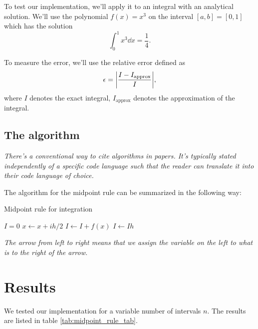 \documentclass[english,notitlepage, reprint]{revtex4-1}  %
\begin{document}
To test our implementation, we'll apply it to an integral with an analytical solution. We'll use the  polynomial $f(x) = x^3$ on the interval $[a,b] = [0,1]$ which has the solution 
\begin{equation}
	\int_0^1 x^3 \dd x = \frac{1}{4}.
\end{equation}

To measure the error, we'll use the relative error defined as 
\begin{equation}
 	\epsilon = \abs{ \frac{I - I_{\text{approx}}}{I} },
\end{equation}
where $I$ denotes the exact integral, $I_\text{approx}$ denotes the approximation of the integral.

\subsection*{The algorithm}
\textit{There's a conventional way to cite algorithms in papers. It's typically stated independently of a specific code language such that the reader can translate it into their code language of choice.}

The algorithm for the midpoint rule can be summarized in the following way:

\begin{algorithm}\caption{Midpoint rule for integration}\label{algo:midpoint_rule}
	\begin{algorithmic}	
		\State $I = 0$ 
		\State $x \leftarrow x + ih/2$   %
		\State $I \leftarrow I + f(x)$  %
		\EndFor
		\State $I \leftarrow Ih$ 
		\EndProcedure
	\end{algorithmic}
\end{algorithm}


\textit{The arrow from left to right means that we assign the variable on the left to what is to the right of the arrow.}

\section{Results}\label{sec:results}
We tested our implementation for a variable number of intervals $n$. The results are listed in table \ref{tab:midpoint_rule_tab}.
\end{document}
